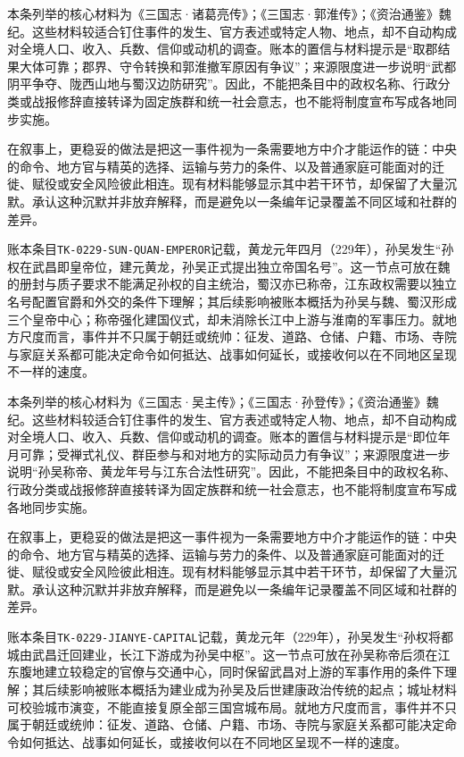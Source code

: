 本条列举的核心材料为《三国志·诸葛亮传》；《三国志·郭淮传》；《资治通鉴》魏纪。这些材料较适合钉住事件的发生、官方表述或特定人物、地点，却不自动构成对全境人口、收入、兵数、信仰或动机的调查。账本的置信与材料提示是“取郡结果大体可靠；郡界、守令转换和郭淮撤军原因有争议”；来源限度进一步说明“武都阴平争夺、陇西山地与蜀汉边防研究”。因此，不能把条目中的政权名称、行政分类或战报修辞直接转译为固定族群和统一社会意志，也不能将制度宣布写成各地同步实施。

在叙事上，更稳妥的做法是把这一事件视为一条需要地方中介才能运作的链：中央的命令、地方官与精英的选择、运输与劳力的条件、以及普通家庭可能面对的迁徙、赋役或安全风险彼此相连。现有材料能够显示其中若干环节，却保留了大量沉默。承认这种沉默并非放弃解释，而是避免以一条编年记录覆盖不同区域和社群的差异。

账本条目\texttt{TK-0229-SUN-QUAN-EMPEROR}记载，黄龙元年四月（229年），孙吴发生“孙权在武昌即皇帝位，建元黄龙，孙吴正式提出独立帝国名号”。这一节点可放在魏的册封与质子要求不能满足孙权的自主统治，蜀汉亦已称帝，江东政权需要以独立名号配置官爵和外交的条件下理解；其后续影响被账本概括为孙吴与魏、蜀汉形成三个皇帝中心；称帝强化建国仪式，却未消除长江中上游与淮南的军事压力。就地方尺度而言，事件并不只属于朝廷或统帅：征发、道路、仓储、户籍、市场、寺院与家庭关系都可能决定命令如何抵达、战事如何延长，或接收何以在不同地区呈现不一样的速度。

本条列举的核心材料为《三国志·吴主传》；《三国志·孙登传》；《资治通鉴》魏纪。这些材料较适合钉住事件的发生、官方表述或特定人物、地点，却不自动构成对全境人口、收入、兵数、信仰或动机的调查。账本的置信与材料提示是“即位年月可靠；受禅式礼仪、群臣参与和对地方的实际动员力有争议”；来源限度进一步说明“孙吴称帝、黄龙年号与江东合法性研究”。因此，不能把条目中的政权名称、行政分类或战报修辞直接转译为固定族群和统一社会意志，也不能将制度宣布写成各地同步实施。

在叙事上，更稳妥的做法是把这一事件视为一条需要地方中介才能运作的链：中央的命令、地方官与精英的选择、运输与劳力的条件、以及普通家庭可能面对的迁徙、赋役或安全风险彼此相连。现有材料能够显示其中若干环节，却保留了大量沉默。承认这种沉默并非放弃解释，而是避免以一条编年记录覆盖不同区域和社群的差异。

账本条目\texttt{TK-0229-JIANYE-CAPITAL}记载，黄龙元年（229年），孙吴发生“孙权将都城由武昌迁回建业，长江下游成为孙吴中枢”。这一节点可放在孙吴称帝后须在江东腹地建立较稳定的官僚与交通中心，同时保留武昌对上游的军事作用的条件下理解；其后续影响被账本概括为建业成为孙吴及后世建康政治传统的起点；城址材料可校验城市演变，不能直接复原全部三国宫城布局。就地方尺度而言，事件并不只属于朝廷或统帅：征发、道路、仓储、户籍、市场、寺院与家庭关系都可能决定命令如何抵达、战事如何延长，或接收何以在不同地区呈现不一样的速度。

